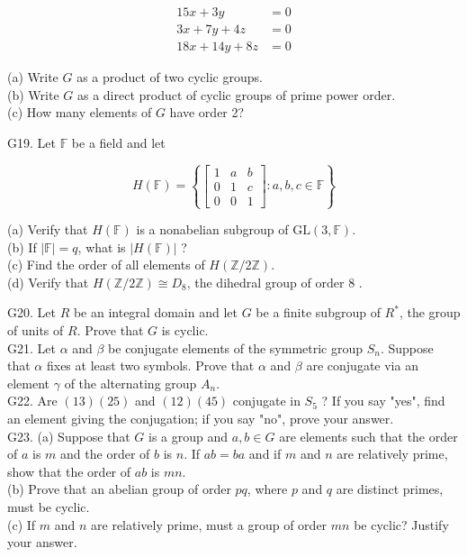 $$
\begin{aligned}
	15 x+3 y & =0 \\
	3 x+7 y+4 z & =0 \\
	18 x+14 y+8 z & =0
\end{aligned}
$$

(a) Write $G$ as a product of two cyclic groups.\\
(b) Write $G$ as a direct product of cyclic groups of prime power order.\\
(c) How many elements of $G$ have order 2?

G19. Let $\mathbb{F}$ be a field and let

$$
H(\mathbb{F})=\left\{\left[\begin{array}{ccc}
	1 & a & b \\
	0 & 1 & c \\
	0 & 0 & 1
\end{array}\right]: a, b, c \in \mathbb{F}\right\}
$$

(a) Verify that $H(\mathbb{F})$ is a nonabelian subgroup of $\mathrm{GL}(3, \mathbb{F})$.\\
(b) If $|\mathbb{F}|=q$, what is $|H(\mathbb{F})|$ ?\\
(c) Find the order of all elements of $H(\mathbb{Z} / 2 \mathbb{Z})$.\\
(d) Verify that $H(\mathbb{Z} / 2 \mathbb{Z}) \cong D_{8}$, the dihedral group of order 8 .

G20. Let $R$ be an integral domain and let $G$ be a finite subgroup of $R^{*}$, the group of units of $R$. Prove that $G$ is cyclic.\\
G21. Let $\alpha$ and $\beta$ be conjugate elements of the symmetric group $S_{n}$. Suppose that $\alpha$ fixes at least two symbols. Prove that $\alpha$ and $\beta$ are conjugate via an element $\gamma$ of the alternating group $A_{n}$.\\
G22. Are $(13)(25)$ and $(12)(45)$ conjugate in $S_{5}$ ? If you say "yes", find an element giving the conjugation; if you say "no", prove your answer.\\
G23. (a) Suppose that $G$ is a group and $a, b \in G$ are elements such that the order of $a$ is $m$ and the order of $b$ is $n$. If $a b=b a$ and if $m$ and $n$ are relatively prime, show that the order of $a b$ is $m n$.\\
(b) Prove that an abelian group of order $p q$, where $p$ and $q$ are distinct primes, must be cyclic.\\
(c) If $m$ and $n$ are relatively prime, must a group of order $m n$ be cyclic? Justify your answer.

